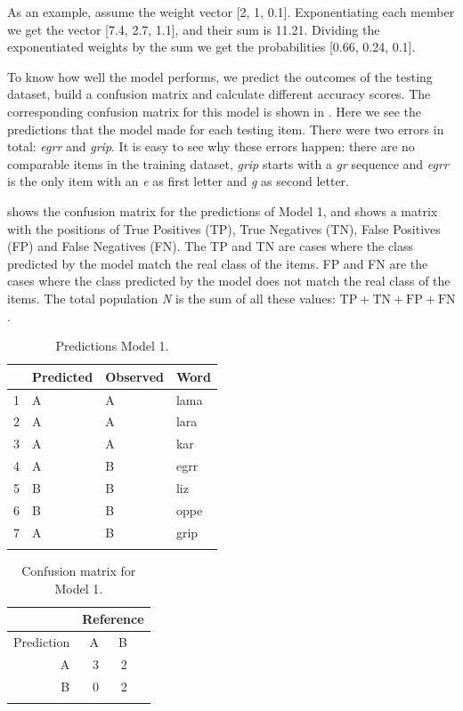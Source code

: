 As an example, assume the weight vector [2, 1, 0.1]. Exponentiating each member we get the vector [7.4, 2.7, 1.1], and their sum is 11.21. Dividing the exponentiated weights by the sum we get the probabilities [0.66, 0.24, 0.1].

To know how well the model performs, we predict the outcomes of the testing dataset, build a confusion matrix and calculate different accuracy scores. The corresponding confusion matrix for this model is shown in . Here we see the predictions that the model made for each testing item. There were two errors in total: \textit{egrr} and \textit{grip}. It is easy to see why these errors happen: there are no comparable items in the training dataset, \textit{grip} starts with a \textit{gr} sequence and \textit{egrr} is the only item with an \textit{e} as first letter and \textit{g} as second letter.

 shows the confusion matrix for the predictions of Model 1, and  shows a matrix with the positions of True Positives (TP), True Negatives (TN), False Positives (FP) and False Negatives (FN). The TP and TN are cases where the class predicted by the model match the real class of the items. FP and FN are the cases where the class predicted by the model does not match the real class of the items. The total population \textit{N} is the sum of all these values: $\textrm{TP}+\textrm{TN}+\textrm{FP}+\textrm{FN}$.

\begin{table}[!htpb]
  \centering
  \begin{tabular}{llll}
    \lsptoprule
    & Predicted & Observed & Word \\
    \midrule
    1 & A & A & lama \\
    2 & A & A & lara \\
    3 & A & A & kar \\
    4 & A & B & egrr \\
    5 & B & B & liz \\
    6 & B & B & oppe \\
    7 & A & B & grip \\
    \lspbottomrule
  \end{tabular}
  \caption{Predictions Model 1.}\label{tab:preds-model1}
\end{table}

\begin{table}[!htpb]
  \centering
  \begin{tabular}{rrrr}
    \lsptoprule
               & \multicolumn{3}{c}{Reference} \\
    \midrule
    Prediction & A  & B                        \\
    A          & 3  & 2                        \\
    B          & 0  & 2                        \\
    \lspbottomrule
  \end{tabular}
    \caption{Confusion matrix for Model 1.}\label{tab:model1-conf}
\end{table}

